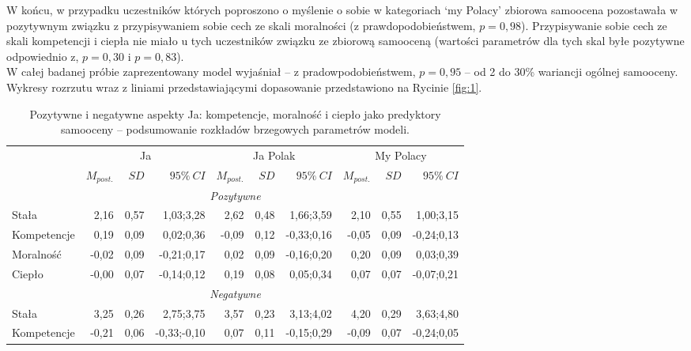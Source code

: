 \documentclass[man]{apa6}
\begin{document}
W końcu, w przypadku uczestników których poproszono o myślenie o sobie w kategoriach `my Polacy' zbiorowa samoocena pozostawała w pozytywnym związku z przypisywaniem sobie cech ze skali moralności (z prawdopodobieństwem, $p = 0,98$). Przypisywanie sobie cech ze skali kompetencji i ciepła nie miało u tych uczestników związku ze zbiorową samooceną (wartości parametrów dla tych skal byłe pozytywne odpowiednio z, $p = 0,30$ i $p = 0,83$).\\

W całej badanej próbie zaprezentowany model wyjaśniał -- z pradowpodobieństwem, $p = 0,95$ -- od 2 do 30\% wariancji ogólnej samooceny. Wykresy rozrzutu wraz z liniami przedstawiającymi dopasowanie przedstawiono na Rycinie \ref{fig:1}.\\

\begin{table*}[htbp]
\vspace*{2em}
\centering
\begin{threeparttable}
\caption{Pozytywne i negatywne aspekty Ja: kompetencje, moralność i ciepło jako predyktory samooceny -- podsumowanie rozkładów brzegowych parametrów modeli.}
\label{tab:1}
\bgroup
\def\tabcolsep{4pt}
\begin{tabular}{lrrrrrrrrr}
\midrule
 &
\multicolumn{3}{c}{Ja} &
\multicolumn{3}{c}{Ja Polak} &
\multicolumn{3}{c}{My Polacy} \\
\cline{2-10}
 & $M_{post.}$    & $SD$   & $95\%\ CI$   & $M_{post.}$    & $SD$   & $95\%\ CI$   & $M_{post.}$    & $SD$   & $95\%\ CI$   \\
\midrule
 \multicolumn{10}{c}{\emph{Pozytywne}}  \\
 Stała       &  2,16 & 0,57 &  1,03;3,28 &  2,62 & 0,48 &  1,66;3,59 &  2,10 & 0,55 &  1,00;3,15 \\
 Kompetencje &  0,19 & 0,09 &  0,02;0,36 & -0,09 & 0,12 & -0,33;0,16 & -0,05 & 0,09 & -0,24;0,13 \\
 Moralność   & -0,02 & 0,09 & -0,21;0,17 &  0,02 & 0,09 & -0,16;0,20 &  0,20 & 0,09 &  0,03;0,39 \\
 Ciepło      & -0,00 & 0,07 & -0,14;0,12 &  0,19 & 0,08 &  0,05;0,34 &  0,07 & 0,07 & -0,07;0,21 \\
 \multicolumn{10}{c}{\emph{Negatywne}}  \\
 Stała       &  3,25 & 0,26 &  2,75;3,75 &  3,57 & 0,23 &  3,13;4,02 &  4,20  & 0,29 & 3,63;4,80 \\
 Kompetencje & -0,21 & 0,06 & -0,33;-0,10 &  0,07 & 0,11 & -0,15;0,29 & -0,09 & 0,07 & -0,24;0,05 \\

\end{tabular}
\end{threeparttable}
\end{table*}
\end{document}

